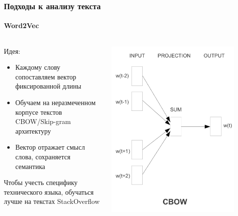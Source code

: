 \documentclass[10pt]{beamer}
\begin{document}
\begin{frame}
\frametitle{Подходы к анализу текста}
\framesubtitle{Word2Vec}

\begin{columns}
    \begin{column}{0.5\textwidth}
    	Идея:
    	\begin{itemize}
        	\item Каждому слову сопоставляем вектор фиксированной длины
        	\item Обучаем на неразмеченном корпусе текстов CBOW/Skip-gram архитектуру        
        	\item Вектор отражает смысл слова, сохраняется семантика
        \end{itemize}

        Чтобы учесть специфику технического языка, обучаться лучше на текстах StackOverflow
    \end{column}
    \begin{column}{0.5\textwidth}
        \begin{center}
            \includegraphics[width=0.9\textwidth]{images/cbow.png} 
        \end{center}
    \end{column}
\end{columns}
\end{frame}
\end{document}
